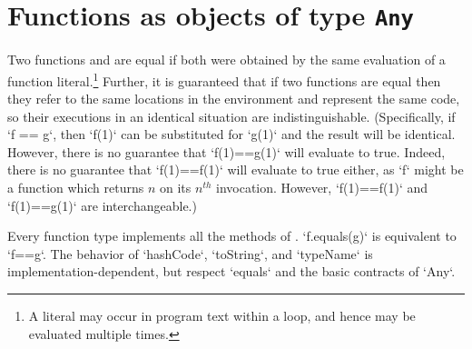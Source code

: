 \section{Functions as objects of type {\tt Any}}
\label{FunctionAnyMethods}

\label{FunctionEquality}
  Two functions  and
 are equal if both were obtained by the same evaluation of a function
literal.\footnote{A literal may occur in program text within a loop, and hence
  may be evaluated multiple times.} Further, it is guaranteed that if two
functions are equal then they refer to the same locations in the environment
and represent the same code, so their executions in an identical situation are
indistinguishable. (Specifically, if \xcd`f == g`, then \xcd`f(1)` can be
substituted for \xcd`g(1)` and the result will be identical. However, there is
no guarantee that \xcd`f(1)==g(1)` will evaluate to true. Indeed, there is no
guarantee that \xcd`f(1)==f(1)` will evaluate to true either, as \xcd`f` might
be a function which returns {$n$} on its {$n^{th}$} invocation. However,
\xcd`f(1)==f(1)` and \xcd`f(1)==g(1)` are interchangeable.)


Every function type implements all the methods of .
\xcd`f.equals(g)` is equivalent to \xcd`f==g`.  The behavior of   \xcd`hashCode`, 
\xcd`toString`, and \xcd`typeName` is implementation-dependent, but 
respect \xcd`equals` and the basic contracts of \xcd`Any`. 

